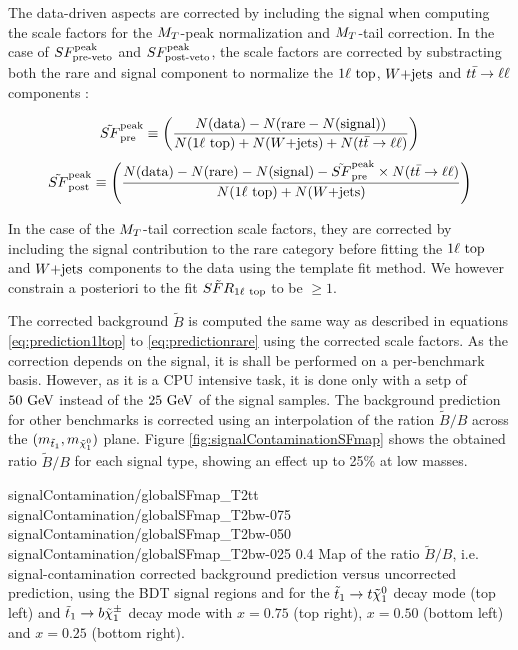         The data-driven aspects are corrected by including the signal when computing the scale factors for the
        $M_T$-peak normalization and $M_T$-tail correction. In the case of $SF_{\text{pre-veto}}^{\text{peak}}$ and $SF_{\text{post-veto}}^{\text{peak}}$, the scale factors
        are corrected by substracting both the rare and signal component to normalize the $1\ell~\text{top}$, $\text{$W$+jets}$
        and $t\bar{t} \rightarrow \ell \ell$ components :

        \begin{equation}
            \tilde{SF}_{\text{pre}}^{\text{peak}} \equiv \left( \frac{N(\text{data}) - N(\text{rare} - N(\text{signal}))}{N(1\ell~\text{top}) + N(\text{$W$+jets}) + N(t\bar{t} \rightarrow \ell \ell)} \right)
        \end{equation}
        \begin{equation}
            \tilde{SF}_{\text{post}}^{\text{peak}} \equiv \left( \frac{N(\text{data}) - N(\text{rare}) - N(\text{signal}) - \tilde{SF}_{\text{pre}}^{\text{peak}} \times N(t\bar{t} \rightarrow \ell \ell)}{N(1\ell~\text{top}) + N(\text{$W$+jets})} \right)
        \end{equation}

        In the case of the $M_T$-tail correction scale factors, they are corrected by including the signal contribution
        to the rare category before fitting the $1\ell~\text{top}$ and $\text{$W$+jets}$ components to the data using the template
        fit method. We however constrain a posteriori to the fit $\tilde{SFR}_{1\ell~\text{top}}$ to be $\geq 1$.

        The corrected background $\tilde{B}$ is computed the same way as described in equations \ref{eq:prediction1ltop} to \ref{eq:predictionrare}
        using the corrected scale factors. As the correction depends on the signal, it is shall be performed on a per-benchmark
        basis. However, as it is a CPU intensive task, it is done only with a setp of $50 ~\text{GeV}$ instead of the $25 ~\text{GeV}$
        of the signal samples. The background prediction for other benchmarks is corrected using an interpolation of
        the ration $\tilde{B}/B$ across the $(m_{\tilde{t}_1},m_{\tilde{\chi}_1^0})$ plane. Figure \ref{fig:signalContaminationSFmap} shows
        the obtained ratio $\tilde{B}/B$ for each signal type, showing an effect up to 25\% at low masses.

                          {signalContamination/globalSFmap_T2tt}
                          {signalContamination/globalSFmap_T2bw-075}
                          {signalContamination/globalSFmap_T2bw-050}
                          {signalContamination/globalSFmap_T2bw-025}
                          {0.4}
                          {Map of the ratio $\tilde{B}/B$, i.e. signal-contamination corrected background prediction versus uncorrected prediction, using the BDT signal regions and for the $\tilde{t}_1 \rightarrow t \tilde{\chi}_1^0$ decay mode (top left) and $\tilde{t}_1 \rightarrow b \tilde{\chi}_1^\pm$ decay mode with $x=0.75$ (top right), $x=0.50$ (bottom left) and $x=0.25$ (bottom right).}

